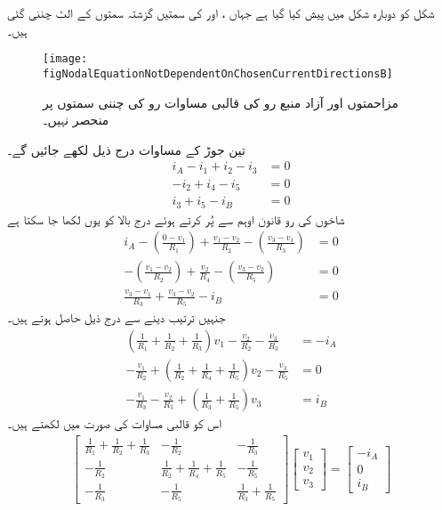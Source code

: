 شکل  کو دوبارہ شکل  میں پیش کیا گیا ہے جہاں ،  اور  کی سمتیں گزشتہ سمتوں کے الٹ چننی گئی ہیں۔
\begin{figure}
\centering
\texttt{[image: figNodalEquationNotDependentOnChosenCurrentDirectionsB]}
\caption{مزاحمتوں اور آزاد منبع رو کی قالبی مساوات رو کی چننی سمتوں پر منحصر نہیں۔}
\label{شکل_جوڑ_چار_جوڑ_تین_آزاد_مساوات_ب}
\end{figure}%
تین جوڑ کے مساوات درج ذیل لکھے جائیں گے۔
\begin{align*}
i_A-i_1+i_2-i_3&=0\\
-i_2+i_4-i_5&=0\\
i_3+i_5-i_B&=0
\end{align*}
شاخوں کی رو قانون اوہم سے پُر کرتے ہوئے درج بالا کو یوں لکھا جا سکتا ہے
\begin{align*}
i_A-\left(\frac{0-v_1}{R_1}\right)+\frac{v_1-v_2}{R_2}-\left(\frac{v_3-v_1}{R_3}\right)&=0\\
-\left(\frac{v_1-v_2}{R_2}\right)+\frac{v_2}{R_4}-\left(\frac{v_3-v_2}{R_5}\right)&=0\\
\frac{v_3-v_1}{R_3}+\frac{v_3-v_2}{R_5}-i_B&=0
\end{align*}
جنہیں ترتیب دینے سے درج ذیل حاصل ہوتے ہیں۔
\begin{align}
\left(\frac{1}{R_1}+\frac{1}{R_2}+\frac{1}{R_3}\right) v_1-\frac{v_2}{R_2}-\frac{v_3}{R_3}&=-i_A \label{مساوات_جوڑ_پہلا_جوڑ}\\
-\frac{v_1}{R_2}+\left(\frac{1}{R_2}+\frac{1}{R_4}+\frac{1}{R_5}\right)v_2-\frac{v_3}{R_5}&=0 \label{مساوات_جوڑ_دوسرا_جوڑ}\\
-\frac{v_1}{R_3}-\frac{v_2}{R_5}+\left(\frac{1}{R_3}+\frac{1}{R_5}\right)v_3&=i_B \label{مساوات_جوڑ_تیسرا_جوڑ}
\end{align}
اس کو قالبی مساوات کی صورت میں لکھتے ہیں۔
\begin{align}\label{مساوات_جوڑ_آزاد_مساوات_دو_جوڑ_پ}
\begin{bmatrix}
\frac{1}{R_1}+\frac{1}{R_2}+\frac{1}{R_3} & -\frac{1}{R_2} &- \frac{1}{R_3}\\[6pt]
-\frac{1}{R_2}&\frac{1}{R_2}+\frac{1}{R_4}+\frac{1}{R_5}& -\frac{1}{R_5}\\[6pt]
-\frac{1}{R_3} & -\frac{1}{R_5}&\frac{1}{R_3}+\frac{1}{R_5}
\end{bmatrix}
\begin{bmatrix}
v_1\\[6pt]
v_2\\[6pt]
v_3
\end{bmatrix}
=
\begin{bmatrix}
-i_A\\[6pt]
0\\[6pt]
i_B
\end{bmatrix}
\end{align}

